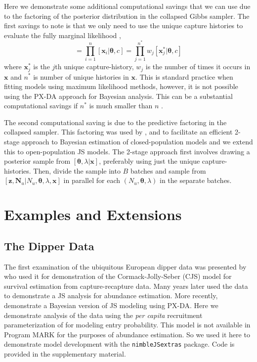 \documentclass[11pt]{article}
\newcommand{\bx}{\ensuremath{\mathbf{x}}}
\newcommand{\bc}{\ensuremath{\mathbf{c}}}
\newcommand{\bz}{\ensuremath{\mathbf{z}}}
\newcommand{\bN}{\ensuremath{\mathbf{N}}}
\newcommand{\bt}{\ensuremath{\boldsymbol{\theta}}}
\begin{document}
Here we demonstrate some additional computational savings that we can use due to the factoring of the posterior distribution in the collapsed Gibbs sampler. The first savings to note is that we only need to use the unique capture histories to evaluate the fully marginal likelihood \citep{turek2016efficient},
\begin{equation}
[\bx|\bt,\bc] = \prod_{i=1}^n [\bx_i|\bt,c] = \prod_{j=1}^{n^*} w_j[\bx_j^*|\bt,c]
\end{equation}
where $\bx_j^*$ is the $j$th unique capture-history, $w_j$ is the number of times it occurs in $\bx$ and $n^*$ is number of unique histories in $\bx$. This is standard practice when fitting models using maximum likelihood methods, however, it is not possible using the PX-DA approach for Bayesian analysis. This can be a substantial computational savings if $n^*$ is much smaller than $n$ \citep{turek2016efficient}. 

The second computational saving is due to the predictive factoring in the collapsed sampler. This factoring was used by \cite{Hooten:2023aa}, and \cite{hooten2024geostatistical} to facilitate an efficient 2-stage approach to Bayesian estimation of closed-population models and we extend this to open-population JS models. The 2-stage approach first involves drawing a posterior sample from $[\bt,\lambda|\bx]$, preferably using just the unique capture-histories. Then, divide the sample into $B$ batches and sample from $[\bz, \bN_u|N_u, \bt,\lambda,\bx]$ in parallel for each $(N_u, \bt,\lambda)$ in the separate batches. 


\section{Examples and Extensions}

\subsection{The Dipper Data}\label{sec:dipper}

The first examination of the ubiquitous European dipper data was presented by \cite{Cormack1964} who used it for demonstration of the Cormack-Jolly-Seber (CJS) model for survival estimation from capture-recapture data. Many years later \cite{Lebreton:1992gr} used the data to demonstrate a JS analysis for abundance estimation. More recently, \cite{Royle:2008kx} demonstrate a Bayesian version of JS modeling using PX-DA. Here we demonstrate analysis of the data using the {\it per capita} recruitment parameterization of \cite{link2005modeling} for modeling entry probability. This model is not available in Program MARK for the purposes of abundance estimation. So we used it here to demonstrate model development with the {\tt nimbleJSextras} package. Code is provided in the supplementary material. 
\end{document}
